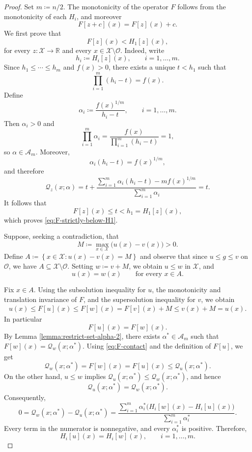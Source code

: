 \documentclass[reqno,11pt]{amsart}
\numberwithin{equation}{section}
\theoremstyle{definition}
\theoremstyle{remark}
\begin{document}
\begin{proof}
Set \( m\coloneqq n/2\).  The monotonicity of the operator \(F\) follows from the monotonicity of each \(H_i\), and moreover
\begin{equation}\label{eq:F-translation}
    F[z+c](x)=F[z](x)+c.
\end{equation}
We first prove that
\begin{equation}\label{eq:F-strictly-below-H1}
    F[z](x)<H_1[z](x),
\end{equation}
for every \(z\colon\mathcal X\to\mathbb R\) and every
\(x\in\mathcal X\setminus\mathcal O\). Indeed, write
\[
    h_i\coloneqq H_i[z](x),
    \qquad i=1,\dots,m.
\]
Since \(h_1\leq\cdots\leq h_m\) and \(f(x)>0\), there exists a unique
\(t<h_1\) such that
\[
    \prod_{i=1}^{m}(h_i-t)=f(x).
\]
Define
\[
    \alpha_i
    \coloneqq
    \frac{f(x)^{1/m}}{h_i-t},
    \qquad i=1,\dots,m.
\]
Then \(\alpha_i>0\) and
\[
    \prod_{i=1}^{m}\alpha_i
    =
    \frac{f(x)}
    {\prod_{i=1}^{m}(h_i-t)}
    =1,
\]
so \(\alpha\in\mathcal A_m\). Moreover,
\[
    \alpha_i(h_i-t)=f(x)^{1/m},
\]
and therefore
\[
\mathcal{Q}_z(x;\alpha) = t+ \frac{\sum_{i=1}^{m}\alpha_i(h_i-t) -m f(x)^{1/m}}{\sum_{i=1}^{m}\alpha_i}=t.
\]
It follows that
\[
    F[z](x)\leq t<h_1=H_1[z](x),
\]
which proves \eqref{eq:F-strictly-below-H1}.

Suppose, seeking a contradiction, that
\[
    M
    \coloneqq
    \max_{x\in\mathcal X}\bigl(u(x)-v(x)\bigr)>0.
\]
Define \(A \coloneqq \left\{x\in\mathcal X \colon u(x)-v(x)=M\right\}\) and observe that since \(u\leq g\leq v\) on \(\mathcal O\), we have \(A\subseteq\mathcal X\setminus\mathcal O\). Setting \(w\coloneqq v+M\), we obtain \(u\leq w\) in \(\mathcal X\), and
\[
    u(x)=w(x)
    \qquad\text{for every }x\in A.
\]

Fix \(x\in A\). Using the subsolution inequality for \(u\), the
monotonicity and translation invariance of \(F\), and the supersolution inequality for \(v\), we obtain
\[
\begin{aligned}
    u(x) \leq F[u](x) \leq F[w](x) = F[v](x)+M \leq v(x)+M=u(x).
\end{aligned}
\]
In particular
\begin{equation}\label{eq:F-contact}
    F[u](x)=F[w](x).
\end{equation}
By Lemma \ref{lemma:restrict-set-alpha-2}, there exists
\(\alpha^*\in\mathcal A_m\) such that \(F[w](x)=\mathcal{Q}_w(x;\alpha^*)\). Using \eqref{eq:F-contact} and the definition of \(F[u]\), we get
\[
    \mathcal{Q}_w(x;\alpha^*)
    =
    F[w](x)
    =
    F[u](x)
    \leq
    \mathcal{Q}_u(x;\alpha^*).
\]
On the other hand, \(u\leq w\) implies \(\mathcal{Q}_u(x;\alpha^*)\leq \mathcal{Q}_w(x;\alpha^*)\), and hence
\[
    \mathcal{Q}_u(x;\alpha^*)=\mathcal{Q}_w(x;\alpha^*).
\]
Consequently,
\[
    0
    =
    \mathcal{Q}_w(x;\alpha^*)-\mathcal{Q}_u(x;\alpha^*)
    =
    \frac{
        \displaystyle
        \sum_{i=1}^{m}\alpha_i^*
        \bigl(H_i[w](x)-H_i[u](x)\bigr)
    }{
        \displaystyle\sum_{i=1}^{m}\alpha_i^*
    }.
\]
Every term in the numerator is nonnegative, and every
\(\alpha_i^*\) is positive. Therefore,
\[
    H_i[u](x)=H_i[w](x),
    \qquad i=1,\dots,m.
\]


\end{proof}
\end{document}
